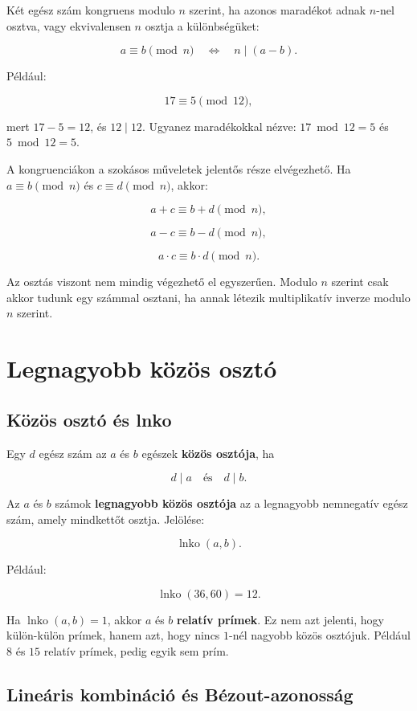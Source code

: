 Két egész szám kongruens modulo $n$ szerint, ha azonos maradékot adnak $n$-nel osztva, vagy ekvivalensen $n$ osztja a különbségüket:

\[
a\equiv b\pmod n \quad\Longleftrightarrow\quad n\mid(a-b).
\]

Például:

\[
17\equiv5\pmod{12},
\]

mert $17-5=12$, és $12\mid12$. Ugyanez maradékokkal nézve: $17\bmod12=5$ és $5\bmod12=5$.

A kongruenciákon a szokásos műveletek jelentős része elvégezhető. Ha $a\equiv b\pmod n$ és $c\equiv d\pmod n$, akkor:

\[
a+c\equiv b+d\pmod n,
\]

\[
a-c\equiv b-d\pmod n,
\]

\[
a\cdot c\equiv b\cdot d\pmod n.
\]

Az osztás viszont nem mindig végezhető el egyszerűen. Modulo $n$ szerint csak akkor tudunk egy számmal osztani, ha annak létezik multiplikatív inverze modulo $n$ szerint.

\section{Legnagyobb közös osztó}

\subsection{Közös osztó és lnko}

Egy $d$ egész szám az $a$ és $b$ egészek \textbf{közös osztója}, ha

\[
d\mid a \quad\text{és}\quad d\mid b.
\]

Az $a$ és $b$ számok \textbf{legnagyobb közös osztója} az a legnagyobb nemnegatív egész szám, amely mindkettőt osztja. Jelölése:

\[
\operatorname{lnko}(a,b).
\]

Például:

\[
\operatorname{lnko}(36,60)=12.
\]

Ha $\operatorname{lnko}(a,b)=1$, akkor $a$ és $b$ \textbf{relatív prímek}. Ez nem azt jelenti, hogy külön-külön prímek, hanem azt, hogy nincs $1$-nél nagyobb közös osztójuk. Például $8$ és $15$ relatív prímek, pedig egyik sem prím.

\subsection{Lineáris kombináció és Bézout-azonosság}

